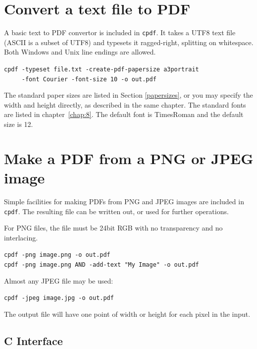 \documentclass{book}
\begin{document}
\section{Convert a text file to PDF}
A basic text to PDF convertor is included in \texttt{cpdf}. It takes a UTF8 text file (ASCII is a subset of UTF8) and typesets it ragged-right, splitting on whitespace. Both Windows and Unix line endings are allowed. 

\begin{framed}
 \noindent\small\verb?cpdf -typeset file.txt -create-pdf-papersize a3portrait?\\
 \noindent\small\verb?     -font Courier -font-size 10 -o out.pdf?
\end{framed}

\noindent The standard paper sizes are listed in Section \ref{papersizes}, or you may specify the width and height directly, as described in the same chapter. The standard fonts are listed in chapter~\ref{chap:8}. The default font is TimesRoman and the default size is 12.

\section{Make a PDF from a PNG or JPEG image}

Simple facilities for making PDFs from PNG and JPEG images are included in \texttt{cpdf}. The resulting file can be written out, or used for further operations.

For PNG files, the file must be 24bit RGB with no transparency and no interlacing.

\begin{framed}
 \noindent\small\verb?cpdf -png image.png -o out.pdf?\\
 \noindent\small\verb?cpdf -png image.png AND -add-text "My Image" -o out.pdf?
\end{framed}

\noindent Almost any JPEG file may be used:

\begin{framed}
 \noindent\small\verb?cpdf -jpeg image.jpg -o out.pdf?
\end{framed}

\noindent The output file will have one point of width or height for each pixel in the input.


\begin{cpdflib}
\clearpage
\section*{C Interface}
\begin{small}\tt

\end{small}
\end{cpdflib}
\end{document}
